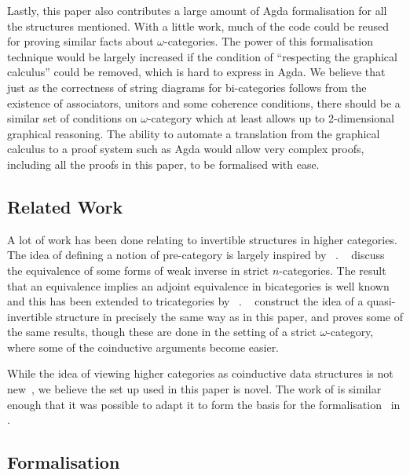 \documentclass{article}
\begin{document}
Lastly, this paper also contributes a large amount of Agda
formalisation for all the structures mentioned. With a little work,
much of the code could be reused for proving similar facts about
\(\omega\)-categories. The power of this formalisation technique would
be largely increased if the condition of ``respecting the graphical
calculus'' could be removed, which is hard to express in Agda. We believe that
just as the correctness of string diagrams for bi-categories follows
from the existence of associators, unitors and some coherence
conditions, there should be a similar set of conditions on
\(\omega\)-category which at least allows up to 2-dimensional
graphical reasoning. The ability to automate a translation from the
graphical calculus to a proof system such as Agda would allow very
complex proofs, including all the proofs in this paper, to be
formalised with ease.

\subsection{Related Work}\label{sec:related}

A lot of work has been done relating to invertible structures in
higher categories. The idea of defining a notion of pre-category is
largely inspired by \citeauthor{Cheng2007}~\cite{Cheng2007}.
\citeauthor{kansangian2009weak}~\cite{kansangian2009weak} discuss the
equivalence of some forms of weak inverse in strict \(n\)-categories.
The result that an equivalence implies an adjoint equivalence in
bicategories is well known and this has been extended to tricategories
by
\citeauthor{gurski2012biequivalences}~\cite{gurski2012biequivalences}.
\citeauthor*{lafont2010folk}~\cite{lafont2010folk} construct the idea
of a quasi-invertible structure in precisely the same way as in this
paper, and proves some of the same results, though these are done in
the setting of a strict \(\omega\)-category, where some of the
coinductive arguments become easier.

While the idea of viewing higher categories as coinductive data
structures is not
new~\cite{cheng2012weak,hirschowitz_et_al:LIPIcs:2015:5166}, we
believe the set up used in this paper is novel. The work of
\citeauthor{hirschowitz_et_al:LIPIcs:2015:5166} is similar enough that
it was possible to adapt it to form the basis for the
formalisation~\cite{rice_agda} in .

\subsection{Formalisation}\label{sec:formalisation}
\end{document}
